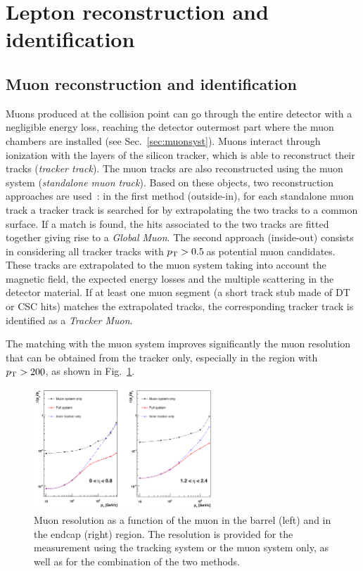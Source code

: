 \section{Lepton reconstruction and identification}\label{sec:leptonID}

\subsection{Muon reconstruction and identification}\label{sec:muID}
Muons produced at the collision point can go through the entire detector with a negligible energy loss, reaching the detector outermost part where the muon chambers are installed (see Sec.~\ref{sec:muonsyst}). Muons interact through ionization with the layers of the silicon tracker, which is able to reconstruct their tracks (\emph{tracker track}). The muon tracks are also reconstructed using the muon system (\emph{standalone muon track}). Based on these objects, two reconstruction approaches are used~\cite{Chatrchyan:2012xi}: in the first method (outside-in), for each standalone muon track a tracker track is searched for by extrapolating the two tracks to a common surface. If a match is found, the hits associated to the two tracks are fitted together giving rise to a \emph{Global Muon}. The second approach (inside-out) consists in considering all tracker tracks with $p_\mathrm{T} > 0.5$\,\GeV as potential muon candidates. These tracks are extrapolated to the muon system taking into account the magnetic field, the expected energy losses and the multiple scattering in the detector material. If at least one muon segment (a short track stub made of DT or CSC hits) matches the extrapolated tracks, the corresponding tracker track is identified as a \emph{Tracker Muon}.

The matching with the muon system improves significantly the muon \pt resolution that can be obtained from the tracker only, especially in the region with $p_\mathrm{T} > 200$\GeV, as shown in Fig.~\ref{fig:muptres}. 
\begin{figure}[htb]
\centering
\includegraphics[width=0.6\textwidth]{images/muptres.png}
\caption{Muon \pt resolution as a function of the muon \pt in the barrel (left) and in the endcap (right) region. The resolution is provided for the measurement using the tracking system or the muon system only, as well as for the combination of the two methods.}\label{fig:muptres}
\end{figure}

